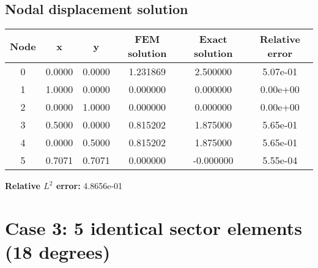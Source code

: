 \subsection{Nodal displacement solution}
\begin{tabular}{|c|c|c|c|c|c|}
\hline
Node & x & y & FEM solution & Exact solution & Relative error \\
\hline
0 & 0.0000 & 0.0000 & 1.231869 & 2.500000 & 5.07e-01 \\
1 & 1.0000 & 0.0000 & 0.000000 & 0.000000 & 0.00e+00 \\
2 & 0.0000 & 1.0000 & 0.000000 & 0.000000 & 0.00e+00 \\
3 & 0.5000 & 0.0000 & 0.815202 & 1.875000 & 5.65e-01 \\
4 & 0.0000 & 0.5000 & 0.815202 & 1.875000 & 5.65e-01 \\
5 & 0.7071 & 0.7071 & 0.000000 & -0.000000 & 5.55e-04 \\
\hline
\end{tabular}
\textbf{Relative $L^2$ error:} 4.8656e-01
\section{Case 3: 5 identical sector elements (18 degrees)}
